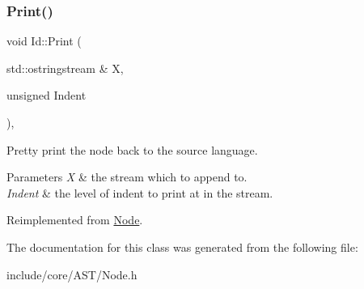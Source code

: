 \subsubsection{\texorpdfstring{Print()}{Print()}}
{\footnotesize\ttfamily void Id\+::\+Print (\begin{DoxyParamCaption}\item[{std\+::ostringstream \&}]{X,  }\item[{unsigned}]{Indent }\end{DoxyParamCaption})\hspace{0.3cm}{\ttfamily [override]}, {\ttfamily [virtual]}}

Pretty print the node back to the source language. 
\begin{DoxyParams}{Parameters}
{\em X} & the stream which to append to. \\
\hline
{\em Indent} & the level of indent to print at in the stream. \\
\hline
\end{DoxyParams}


Reimplemented from \mbox{\hyperlink{class_node_a5325b760a6e6fe94227c0cff53af2c45}{Node}}.



The documentation for this class was generated from the following file\+:\begin{DoxyCompactItemize}
\item 
include/core/\+A\+S\+T/Node.\+h\end{DoxyCompactItemize}
